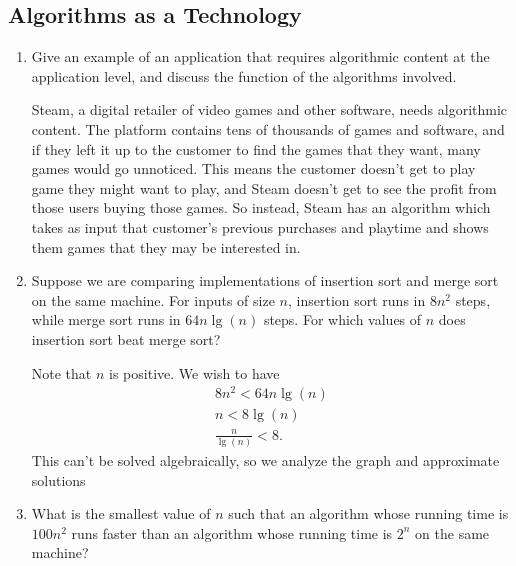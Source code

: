 \documentclass[Chapter01]{subfiles}
\begin{document}
	\subsection{Algorithms as a Technology}

	\begin{enumerate}[leftmargin=\labelsep]
		\item Give an example of an application that requires algorithmic content at the application level, and discuss the function of the algorithms involved.
		\begin{answer}
			Steam, a digital retailer of video games and other software, needs algorithmic content. The platform contains tens of thousands of games and software, and if they left it up to the customer to find the games that they want, many games would go unnoticed. This means the customer doesn't get to play game they might want to play, and Steam doesn't get to see the profit from those users buying those games. So instead, Steam has an algorithm which takes as input that customer's previous purchases and playtime and shows them games that they may be interested in.
		\end{answer}

		\item Suppose we are comparing implementations of insertion sort and merge sort on the same machine. For inputs of size $n$, insertion sort runs in $8n^2$ steps, while merge sort runs in $64n \lg(n)$ steps. For which values of $n$ does insertion sort beat merge sort?
		\begin{answer}
			Note that $n$ is positive. We wish to have
			\begin{align*}
				8n^2 < 64n \lg(n) \tag*{$\impliedby$}\\
				n < 8 \lg(n) \tag*{$\impliedby$}\\
				\frac{n}{\lg(n)} < 8.
			\end{align*}
			This can't be solved algebraically, so we analyze the graph and approximate solutions
		\end{answer}

		\item What is the smallest value of $n$ such that an algorithm whose running time is $100n^2$ runs faster than an algorithm whose running time is $2^n$ on the same machine?
		\begin{answer}
			
		\end{answer}
	\end{enumerate}
\end{document}

